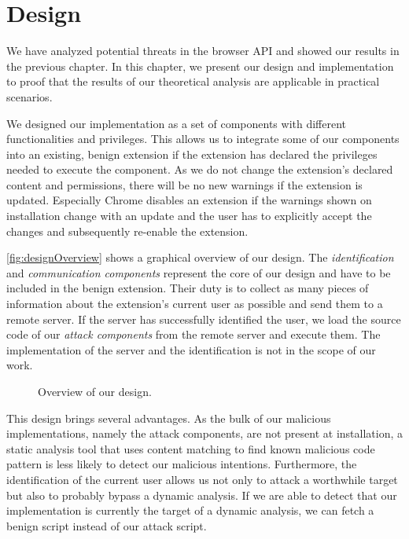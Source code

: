 
\chapter{Design}
\label{chp:design}

	We have analyzed potential threats in the browser API and showed our results in the previous chapter. In this chapter, we present our design and implementation to proof that the results of our theoretical analysis are applicable in practical scenarios. 
	
	We designed our implementation as a set of components with different functionalities and privileges. This allows us to integrate some of our components into an existing, benign extension if the extension has declared the privileges needed to execute the component. As we do not change the extension's declared content and permissions, there will be no new warnings if the extension is updated. Especially Chrome disables an extension if the warnings shown on installation change with an update and the user has to explicitly accept the changes and subsequently re-enable the extension. 
	
	\autoref{fig:designOverview} shows a graphical overview of our design. The \textit{identification} and \textit{communication components} represent the core of our design and have to be included in the benign extension. Their duty is to collect as many pieces of information about the extension's current user as possible and send them to a remote server. If the server has successfully identified the user, we load the source code of our \textit{attack components} from the remote server and execute them. The implementation of the server and the identification is not in the scope of our work. 
	
	\begin{figure}[h]
		\centering
		\def\svgscale{0.8}
		
		\caption{Overview of our design.}
		\label{fig:designOverview}
	\end{figure}
	
	This design brings several advantages. As the bulk of our malicious implementations, namely the attack components, are not present at installation, a static analysis tool that uses content matching to find known malicious code pattern is less likely to detect our malicious intentions. Furthermore, the identification of the current user allows us not only to attack a worthwhile target but also to probably bypass a dynamic analysis. If we are able to detect that our implementation is currently the target of a dynamic analysis, we can fetch a benign script instead of our attack script. 

